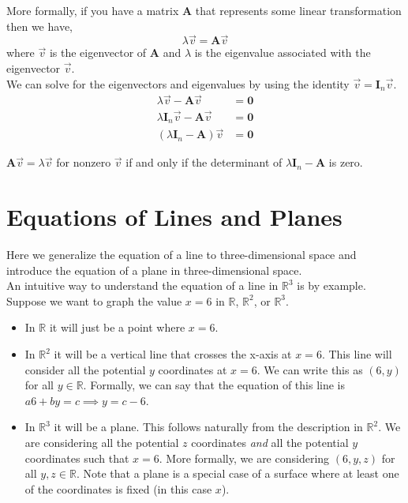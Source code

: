 \documentclass[12pt]{article}
\begin{document}
More formally, if you have a matrix $\mathbf{A}$ that represents some linear transformation then we have,
\[
\lambda\vec{v}=\mathbf{A}\vec{v}
\]
where $\vec{v}$ is the eigenvector of $\mathbf{A}$ and $\lambda$ is the eigenvalue associated with the eigenvector $\vec{v}$. \\

We can solve for the eigenvectors and eigenvalues by using the identity $\vec{v}=\mathbf{I}_n\vec{v}$.
\begin{align*}
\lambda\vec{v}-\mathbf{A}\vec{v} &= \mathbf{0} \\
\lambda\mathbf{I}_n\vec{v}-\mathbf{A}\vec{v}&= \mathbf{0} \\
(\lambda\mathbf{I}_n-\mathbf{A})\vec{v} &= \mathbf{0}
\end{align*}

$\mathbf{A}\vec{v}=\lambda\vec{v}$ for nonzero $\vec{v}$ if and only if the determinant of $\lambda\mathbf{I}_n-\mathbf{A}$ is zero. \\


\pagebreak
\section{Equations of Lines and Planes}

Here we generalize the equation of a line to three-dimensional space and introduce the equation of a plane in three-dimensional space. \\

 An intuitive way to understand the equation of a line in $\mathbb{R}^3$ is by example. Suppose we want to graph the value $x=6$ in $\mathbb{R}$, $\mathbb{R}^2$, or $\mathbb{R}^3$.
\begin{itemize}
\item In $\mathbb{R}$ it will just be a point where $x=6$.
\item In $\mathbb{R}^2$ it will be a vertical line that crosses the x-axis at $x=6$. This line will consider all the potential $y$ coordinates at $x=6$. We can write this as $(6,y)$ for all $y\in\mathbb{R}$. Formally, we can say that the equation of this line is $a6+by=c\implies y=c-6$.
\item In $\mathbb{R}^3$ it will be a plane. This follows naturally from the description in $\mathbb{R}^2$. We are considering all the potential $z$ coordinates \emph{and} all the potential $y$ coordinates such that $x=6$. More formally, we are considering $(6,y,z)$ for all $y,z\in\mathbb{R}$. Note that a plane is a special case of a surface where at least one of the coordinates is fixed (in this case $x$).
\end{itemize}
\end{document}
